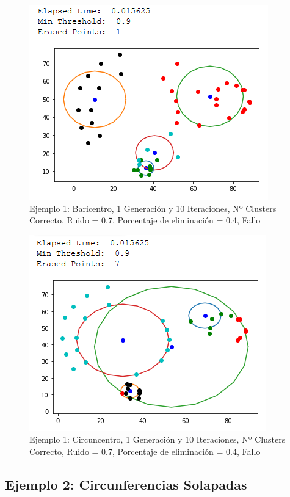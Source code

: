 \documentclass[conference,a4paper]{IEEEtran}
\begin{document}
\begin{figure}[H]
\centering
\includegraphics[scale=0.65]{Experimentacion/Ejemplo1/ej1_b_1_10_re}
\caption{Ejemplo 1: Baricentro, 1 Generación y 10 Iteraciones,  Nº Clusters Correcto, Ruido = 0.7, Porcentaje de eliminación = 0.4, Fallo\\}
\end{figure}

\begin{figure}[H]
\centering
\includegraphics[scale=0.65]{Experimentacion/Ejemplo1/ej1_c_1_10_re_wrong}
\caption{Ejemplo 1: Circuncentro, 1 Generación y 10 Iteraciones,  Nº Clusters Correcto, Ruido = 0.7, Porcentaje de eliminación = 0.4, Fallo\\}
\end{figure}

\newpage
\subsection{Ejemplo 2: Circunferencias Solapadas}
\end{document}

